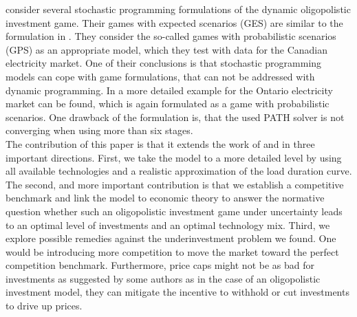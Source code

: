 \cite{Genc2007} consider several stochastic programming formulations of the dynamic oligopolistic investment game. Their games with expected scenarios (GES) are similar to the formulation in \cite{Pineau2003}. They consider the so-called games with probabilistic scenarios (GPS) as an appropriate model, which they test with data for the Canadian electricity market. One of their conclusions is that stochastic programming models can cope with game formulations, that can not be addressed with dynamic programming. In \cite{Genc2008} a more detailed example for the Ontario electricity market can be found, which is again formulated as a game with probabilistic scenarios. One drawback of the formulation is, that the used PATH solver is not converging when using more than six stages. \\
The contribution of this paper is that it extends the work of \cite{Genc2007} and  \cite{Genc2008} in three important directions. First, we take the model to a more detailed level by using all available technologies and a realistic approximation of the load duration curve. The second, and more important contribution is that we establish a competitive benchmark and link the model to economic theory to answer the normative question whether such an oligopolistic investment game under uncertainty leads to an optimal level of investments and an optimal technology mix. Third, we explore possible remedies against the underinvestment problem we found. One would be introducing more competition to move the market toward the perfect competition benchmark. Furthermore, price caps might not be as bad for investments as suggested by some authors as in the case of an oligopolistic investment model, they can mitigate the incentive to withhold or cut investments to drive up prices.



